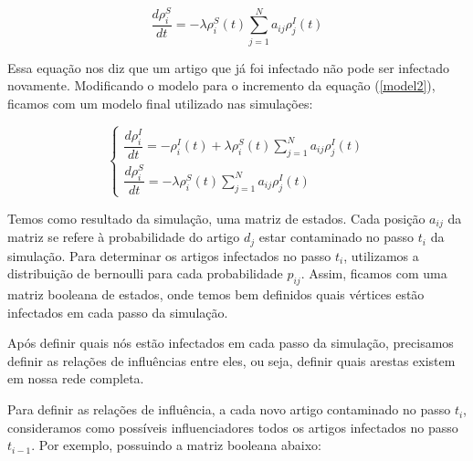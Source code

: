 \documentclass[a4paper,12pt]{article}
\begin{document}
\begin{description}
    \begin{equation}
      \dfrac{d\rho^{S}_{i}}{dt} = - \lambda\rho_{i}^{S}(t) \sum_{j=1}^{N} a_{ij}\rho_{j}^{I}(t)
      \label{model2}
    \end{equation}
    
    Essa equação nos diz que um artigo que já foi infectado não pode ser infectado novamente. Modificando o modelo para o incremento
    da equação (\ref{model2}), ficamos com um modelo final utilizado nas simulações:
    
   
    \begin{equation}
      \begin{cases}
	\dfrac{d\rho^{I}_{i}}{dt} = -\rho^{I}_{i}(t) + \lambda\rho_{i}^{S}(t) \sum_{j=1}^{N} a_{ij}\rho_{j}^{I}(t) \\   
	\dfrac{d\rho^{S}_{i}}{dt} = - \lambda\rho_{i}^{S}(t) \sum_{j=1}^{N} a_{ij}\rho_{j}^{I}(t)
      \end{cases}
    \end{equation}

   
 \end{description}

  
Temos como resultado da simulação, uma matriz de estados. Cada posição $a_{ij}$ da matriz se refere à probabilidade do artigo
$d_{j}$ estar contaminado no passo $t_{i}$ da simulação. Para determinar os artigos infectados no passo $t_{i}$, utilizamos a distribuição
de bernoulli para cada probabilidade $p_{ij}$. Assim, ficamos com uma matriz booleana de estados, onde temos bem definidos quais
vértices estão infectados em cada passo da simulação.

Após definir quais nós estão infectados em cada passo da simulação, precisamos definir as relações de influências entre eles, ou seja,
definir quais arestas existem em nossa rede completa.

Para definir as relações de influência, a cada novo artigo contaminado no passo $t_{i}$, consideramos como possíveis influenciadores todos os artigos
infectados no passo $t_{i-1}$. Por exemplo, possuindo a matriz booleana abaixo:
\end{document}
